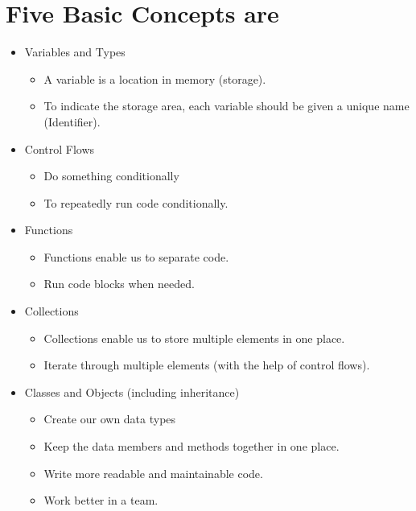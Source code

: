 \documentclass[11pt]{article}
\begin{document}
\section*{Five Basic Concepts are}
\label{sec:org29a6255}
\begin{itemize}
\item Variables and Types
\label{sec:org48cc7c8}
\begin{itemize}
\item A variable is a location in memory (storage).
\item To indicate the storage area, each variable should be given a
unique name (Identifier).
\end{itemize}
\item Control Flows
\label{sec:orgb5f8370}
\begin{itemize}
\item Do something conditionally
\item To repeatedly run code conditionally.
\end{itemize}
\item Functions
\label{sec:orgd92a717}
\begin{itemize}
\item Functions enable us to separate code.
\item Run code blocks when needed.
\end{itemize}
\item Collections
\label{sec:org0ce0bb7}
\begin{itemize}
\item Collections enable us to store multiple elements in one place.
\item Iterate through multiple elements (with the help of control
flows).
\end{itemize}
\item Classes and Objects (including inheritance)
\label{sec:org1a214cf}
\begin{itemize}
\item Create our own data types
\item Keep the data members and methods together in one place.
\item Write more readable and maintainable code.
\item Work better in a team.
\end{itemize}
\end{itemize}
\end{document}
